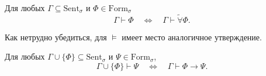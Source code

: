 \documentclass[12pt,a4paper]{article}
\newcommand{\Formul}{\ensuremath{\mathrm{Form}}\xspace}
\newcommand{\Sent}{\ensuremath{\mathrm{Sent}}\xspace}
\newcommand{\tildeforall}{\widetilde{\forall}}
\begin{document}
    \begin{corollary}
        Для любых $\Gamma \subseteq \Sent_\sigma$ и $\Phi \in \Formul_\sigma$
        \[
            \Gamma \vdash \Phi
            \quad \Longleftrightarrow \quad
            \Gamma \vdash \tildeforall \Phi.
        \]
    \end{corollary}

    \begin{remark*}
        Как нетрудно убедиться, для $\vDash$ имеет место аналогичное утверждение.
    \end{remark*}

    \begin{theorem}[о дедукции]
        Для любых $\Gamma \cup \{\Phi\} \subseteq \Sent_\sigma$ и $\Psi \in \Formul_\sigma$,
        \[
            \Gamma \cup \{\Phi\} \vdash \Psi
            \quad \Longleftrightarrow \quad
            \Gamma \vdash \Phi \rightarrow \Psi.
        \]
    \end{theorem}
\end{document}
